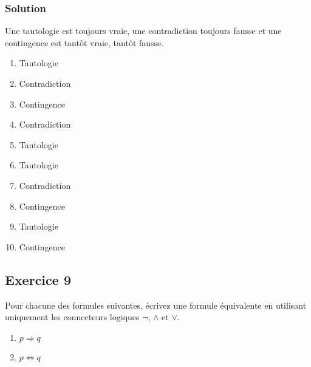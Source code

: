 \subsubsection*{Solution}


    Une tautologie est toujours vraie, une contradiction toujours fausse et une contingence est tantôt vraie, tantôt fausse.

    \begin{enumerate}
        \item Tautologie
        \item Contradiction
        \item Contingence
        \item Contradiction
        \item Tautologie
        \item Tautologie
        \item Contradiction
        \item Contingence
        \item Tautologie
        \item Contingence
    \end{enumerate}
    
% 

\subsection*{Exercice 9}
Pour chacune des formules suivantes, écrivez une formule équivalente
en utilisant uniquement les connecteurs logiques $\neg$, $\land$ et $\lor$.
\begin{enumerate}
	\item $p \Rightarrow q$
	\item $p \Leftrightarrow q$
\end{enumerate}


